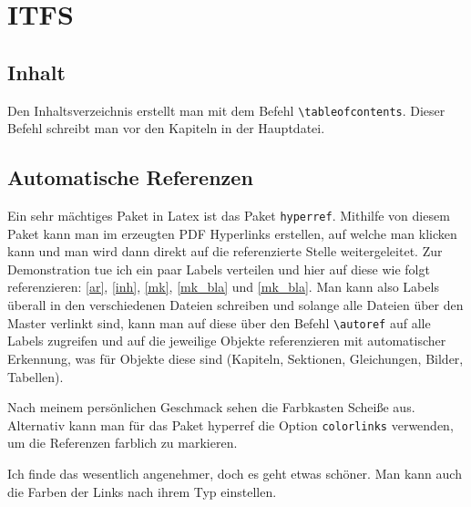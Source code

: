 
\chapter{ITFS}


\section{Inhalt}
\label{inh}

Den Inhaltsverzeichnis erstellt man mit dem Befehl \verb=\tableofcontents=. Dieser Befehl schreibt man vor den Kapiteln in der Hauptdatei.


\section{Automatische Referenzen}
\label{ar}

Ein sehr mächtiges Paket in Latex ist das Paket \verb=hyperref=. Mithilfe von diesem Paket kann man im erzeugten PDF Hyperlinks erstellen, auf welche man klicken kann und man wird dann direkt auf die referenzierte Stelle weitergeleitet. Zur Demonstration tue ich ein paar Labels verteilen und hier auf diese wie folgt referenzieren: \autoref{ar}, \autoref{inh}, \autoref{mk}, \autoref{mk_bla} und \eqref{mk_bla}. Man kann also Labels überall in den verschiedenen Dateien schreiben und solange alle Dateien über den Master verlinkt sind, kann man auf diese über den Befehl \verb=\autoref= auf alle Labels zugreifen und auf die jeweilige Objekte referenzieren mit automatischer Erkennung, was für Objekte diese sind (Kapiteln, Sektionen, Gleichungen, Bilder, Tabellen).

Nach meinem persönlichen Geschmack sehen die Farbkasten Scheiße aus. Alternativ kann man für das Paket hyperref die Option \verb=colorlinks= verwenden, um die Referenzen farblich zu markieren. 

Ich finde das wesentlich angenehmer, doch es geht etwas schöner. Man kann auch die Farben der Links nach ihrem Typ einstellen. 


